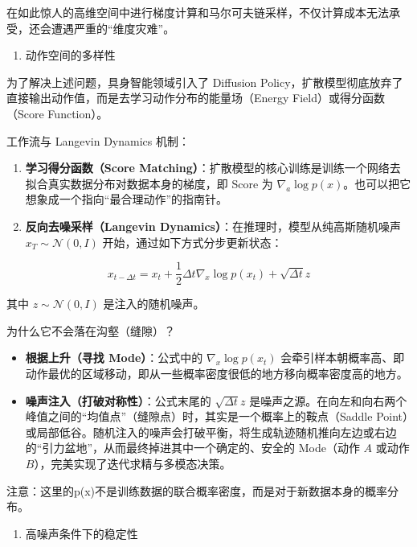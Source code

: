 在如此惊人的高维空间中进行梯度计算和马尔可夫链采样，不仅计算成本无法承受，还会遭遇严重的``维度灾难''。

\begin{enumerate}
\def\labelenumi{\arabic{enumi}.}
\setcounter{enumi}{1}
\tightlist
\item
  动作空间的多样性
\end{enumerate}

为了解决上述问题，具身智能领域引入了 Diffusion Policy，扩散模型彻底放弃了直接输出动作值，而是去学习动作分布的能量场（Energy Field）或得分函数（Score Function）。

工作流与 Langevin Dynamics 机制：

\begin{enumerate}
\def\labelenumi{\arabic{enumi}.}
\tightlist
\item
  \textbf{学习得分函数（Score Matching）}：扩散模型的核心训练是训练一个网络去拟合真实数据分布对数据本身的梯度，即 Score 为 \(\nabla_a\log p(x)\)。也可以把它想象成一个指向``最合理动作''的指南针。
\item
  \textbf{反向去噪采样（Langevin Dynamics）}：在推理时，模型从纯高斯随机噪声 \(x_T\sim\mathcal{N}(0,I)\) 开始，通过如下方式分步更新状态：
\end{enumerate}

\[
x_{t-\Delta t}=x_t+\frac{1}{2}\Delta t\nabla_x\log p(x_t)+\sqrt{\Delta t}z
\]

其中 \(z\sim\mathcal{N}(0,I)\) 是注入的随机噪声。

为什么它不会落在沟壑（缝隙）？

\begin{itemize}
\tightlist
\item
  \textbf{根据上升（寻找 Mode）}：公式中的 \(\nabla_x\log p(x_t)\) 会牵引样本朝概率高、即动作最优的区域移动，即从一些概率密度很低的地方移向概率密度高的地方。
\item
  \textbf{噪声注入（打破对称性）}：公式末尾的 \(\sqrt{\Delta t}z\) 是噪声之源。在向左和向右两个峰值之间的``均值点''（缝隙点）时，其实是一个概率上的鞍点（Saddle Point）或局部低谷。随机注入的噪声会打破平衡，将生成轨迹随机推向左边或右边的``引力盆地''，从而最终掉进其中一个确定的、安全的 Mode（动作 \(A\) 或动作 \(B\)），完美实现了迭代求精与多模态决策。
\end{itemize}

注意：这里的p(x)不是训练数据的联合概率密度，而是对于新数据本身的概率分布。

\begin{enumerate}
\def\labelenumi{\arabic{enumi}.}
\setcounter{enumi}{2}
\tightlist
\item
  高噪声条件下的稳定性
\end{enumerate}

